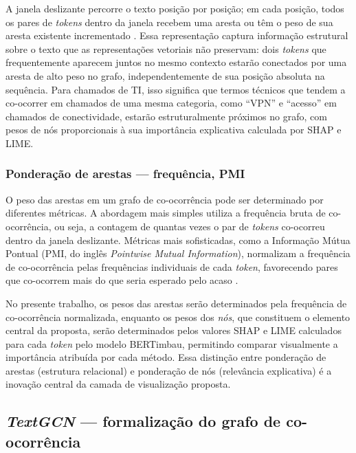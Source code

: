 \documentclass[
    12pt,                %
    openright,           %
    oneside,             %
    a4paper,             %
    english,             %
    brazil               %
]{abntex2}
\begin{document}
A janela deslizante percorre o texto posição por posição; em cada 
posição, todos os pares de \textit{tokens} dentro da janela 
recebem uma aresta ou têm o peso de sua aresta existente 
incrementado \cite{yao2019}. Essa representação captura informação 
estrutural sobre o texto que as representações vetoriais não 
preservam: dois \textit{tokens} que frequentemente aparecem juntos 
no mesmo contexto estarão conectados por uma aresta de alto peso 
no grafo, independentemente de sua posição absoluta na sequência. 
Para chamados de TI, isso significa que termos técnicos que tendem 
a co-ocorrer em chamados de uma mesma categoria, como ``VPN'' e 
``acesso'' em chamados de conectividade, estarão estruturalmente 
próximos no grafo, com pesos de nós proporcionais à sua 
importância explicativa calculada por SHAP e LIME.
\subsubsection{Ponderação de arestas — frequência, PMI}
\label{subsubsec:grafos_ponderacao}

O peso das arestas em um grafo de co-ocorrência pode ser determinado por diferentes métricas. A abordagem mais simples utiliza a frequência bruta de co-ocorrência, ou seja, a contagem de quantas vezes o par de \textit{tokens} co-ocorreu dentro da janela deslizante. Métricas mais sofisticadas, como a Informação Mútua Pontual (PMI, do inglês \textit{Pointwise Mutual Information}), normalizam a frequência de co-ocorrência pelas frequências individuais de cada \textit{token}, favorecendo pares que co-ocorrem mais do que seria esperado pelo acaso \cite{yao2019}.

No presente trabalho, os pesos das arestas serão determinados pela frequência de co-ocorrência normalizada, enquanto os pesos dos \textit{nós}, que constituem o elemento central da proposta, serão determinados pelos valores SHAP e LIME calculados para cada \textit{token} pelo modelo BERTimbau, permitindo comparar visualmente a importância atribuída por cada método. Essa distinção entre ponderação de arestas (estrutura relacional) e ponderação de nós (relevância explicativa) é a inovação central da camada de visualização proposta.

\subsection{\textit{TextGCN} — formalização do grafo de co-ocorrência}
\label{subsec:textgcn}
\end{document}

